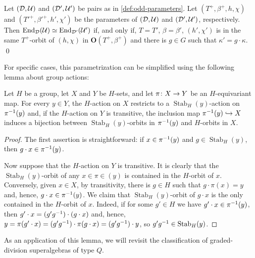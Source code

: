 \begin{cor}\label{cor:classification-odd-general}
    Let $(\mathcal{D}, \mathcal U)$ and $(\mathcal{D}', \mathcal U')$ be pairs as in \cref{def:odd-parameters}. 
    Let $(T^+, \beta^+, h,\chi)$ and $(T'^+, \beta'^+, h',\chi')$ be the parameters of $(\mathcal{D}, \mathcal U)$ and $(\mathcal{D}', \mathcal U')$, respectively. 
	Then $\operatorname{End}_{\mathcal{D}} (\mathcal U) \simeq \operatorname{End}_{\mathcal{D}'} (\mathcal U')$ if, and only if, $T=T'$, $\beta=\beta'$, $(h', \chi')$ is in the same $T^+$-orbit of $(h, \chi)$ in $\mathbf {O} (T^+, \beta^+)$ and there is $g\in G$ such that $\kappa' = g \cdot \kappa$. \qed
\end{cor}

For specific cases, this parametrization can be simplified using the following lemma about group actions: 

\begin{lemma}\label{lemma:lemma-on-actions}
    Let $H$ be a group, let $X$ and $Y$ be $H$-sets, and let $\pi\colon X \to Y$ be an $H$-equivariant map. 
    For every $y \in Y$, the $H$-action on $X$ restricts to a $\operatorname{Stab}_H (y)$-action on $\pi^{-1}(y)$ and, if the $H$-action on $Y$ is transitive, the inclusion map $\pi^{-1}(y) \hookrightarrow X$ induces a bijection between $\operatorname{Stab}_H (y)$-orbits in $\pi^{-1}(y)$ and $H$-orbits in $X$.  
\end{lemma}

\begin{proof}
    The first assertion is straightforward: if $x\in \pi^{-1}(y)$ and $g \in \operatorname{Stab}_H (y)$, then $g \cdot x \in \pi^{-1}(y)$. 
    
    Now suppose that the $H$-action on $Y$ is transitive. 
    It is clearly that the $\operatorname{Stab}_H (y)$-orbit of any $x\in \pi\in(y)$ is contained in the $H$-orbit of $x$. Conversely, given $x\in X$, by transitivity, there is $g\in H$ such that $g \cdot \pi(x) = y$ and, hence, $g\cdot x \in \pi^{-1} (y)$. 
    We claim that $\operatorname{Stab}_H (y)$-orbit of $g\cdot x$ is the only contained in the $H$-orbit of $x$. 
    Indeed, if for some $g'\in H$ we have $g'\cdot x \in \pi^{-1}(y)$, then $g'\cdot x = (g'g^{-1})\cdot (g\cdot x)$ and, hence, $y = \pi(g'\cdot x) = (g'g^{-1})\cdot \pi(g\cdot x) = (g'g^{-1}) \cdot y$, so $g'g^{-1} \in \operatorname{Stab}_H (y)$.
\end{proof}

As an application of this lemma, we will revisit the classification of graded-division superalgebras of type $Q$. 

